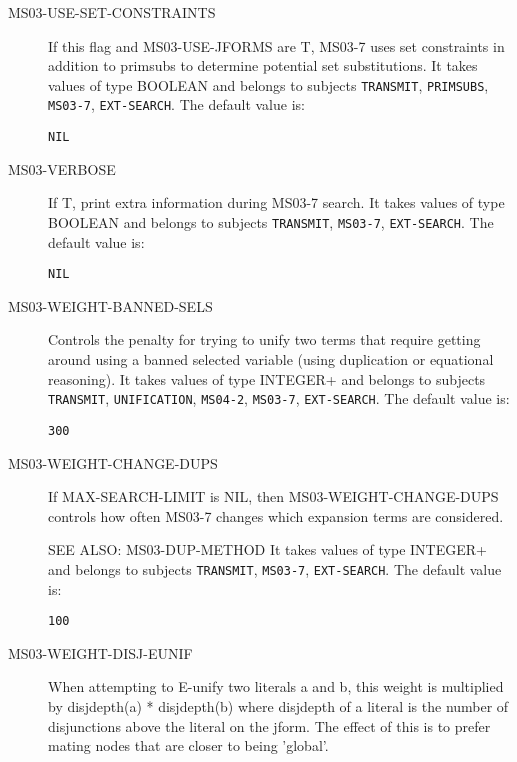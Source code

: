 \begin{description}
\item[MS03-USE-SET-CONSTRAINTS]  
If this flag and MS03-USE-JFORMS are T,
MS03-7 uses set constraints in addition to primsubs 
to determine potential set substitutions.
It takes values of type BOOLEAN and belongs to subjects \texttt{TRANSMIT}, \texttt{PRIMSUBS}, \texttt{MS03-7}, \texttt{EXT-SEARCH}.  The default value is: \begin{lstlisting}
NIL
\end{lstlisting}

\item[MS03-VERBOSE]  
If T, print extra information during MS03-7 search.
It takes values of type BOOLEAN and belongs to subjects \texttt{TRANSMIT}, \texttt{MS03-7}, \texttt{EXT-SEARCH}.  The default value is: \begin{lstlisting}
NIL
\end{lstlisting}

\item[MS03-WEIGHT-BANNED-SELS]  
Controls the penalty for trying to unify two terms that require
getting around using a banned selected variable (using duplication or
equational reasoning).
It takes values of type INTEGER+ and belongs to subjects \texttt{TRANSMIT}, \texttt{UNIFICATION}, \texttt{MS04-2}, \texttt{MS03-7}, \texttt{EXT-SEARCH}.  The default value is: \begin{lstlisting}
300
\end{lstlisting}

\item[MS03-WEIGHT-CHANGE-DUPS]  
If MAX-SEARCH-LIMIT is NIL, then MS03-WEIGHT-CHANGE-DUPS controls
how often MS03-7 changes which expansion terms are considered.

SEE ALSO:  MS03-DUP-METHOD
It takes values of type INTEGER+ and belongs to subjects \texttt{TRANSMIT}, \texttt{MS03-7}, \texttt{EXT-SEARCH}.  The default value is: \begin{lstlisting}
100
\end{lstlisting}

\item[MS03-WEIGHT-DISJ-EUNIF]  
When attempting to E-unify two literals a and b, this weight is
multiplied by disjdepth(a) * disjdepth(b) where disjdepth of a literal
is the number of disjunctions above the literal on the jform.
The effect of this is to prefer mating nodes that are closer to being 'global'.


\end{description}
